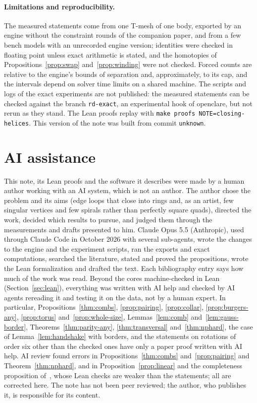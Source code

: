 \documentclass[11pt,a4paper]{article}
\providecommand{\enginecommit}{unknown}
\begin{document}
\paragraph{Limitations and reproducibility.}
The measured statements come from one T-mesh of one body, exported by an
engine without the constraint rounds of the companion paper, and from a few
bench models with an unrecorded engine version; identities were checked in
floating point unless exact arithmetic is stated, and the homotopies of
Propositions~\ref{prop:swap} and~\ref{prop:winding} were not checked. Forced
counts are relative to the engine's bounds of separation and, approximately,
to its cap, and the intervals depend on solver time limits on a shared
machine. The scripts and logs of the exact experiments are not published: the
measured statements can be checked against the branch \texttt{rd-exact}, an
experimental hook of openclare, but not rerun as they stand. The Lean proofs
replay with \texttt{make proofs NOTE=closing-helices}. This version of the
note was built from commit \texttt{\enginecommit}.

\section*{AI assistance}
This note, its Lean proofs and the software it describes were made by a human
author working with an AI system, which is not an author. The author chose the
problem and its aims (edge loops that close into rings and, as an artist, few
singular vertices and few spirals rather than perfectly square quads),
directed the work, decided which results to pursue, and judged them through
the measurements and drafts presented to him. Claude Opus 5.5 (Anthropic),
used through Claude Code in October 2026 with several sub-agents, wrote the
changes to the engine and the experiment scripts, ran the exports and exact
computations, searched the literature, stated and proved the propositions,
wrote the Lean formalization and drafted the text. Each bibliography entry says how much of the work was read.
Beyond the cores machine-checked in Lean (Section~\ref{sec:lean}), everything
was written with AI help and checked by AI agents rereading it and testing it
on the data, not by a human expert. In particular, Propositions~\ref{thm:combs},
\ref{prop:pairing}, \ref{prop:collar}, \ref{prop:burgers-any}, \ref{prop:torus}
and~\ref{prop:whole-size}, Lemmas~\ref{lem:comb} and~\ref{lem:gauss-border},
Theorems~\ref{thm:parity-any}, \ref{thm:transversal} and~\ref{thm:nphard}, the
case of Lemma~\ref{lem:handshake} with borders, and the statements on
rotations of order six other than the checked ones have only a paper proof
written with AI help. AI review found errors in Propositions~\ref{thm:combs}
and~\ref{prop:pairing} and Theorem~\ref{thm:nphard}, and in
Proposition~\ref{prop:linear} and the completeness proposition
of~\cite{gardent2026loops}, whose Lean checks are weaker than the statements;
all are corrected here. The note has not been peer reviewed; the author, who
publishes it, is responsible for its content.
\end{document}
